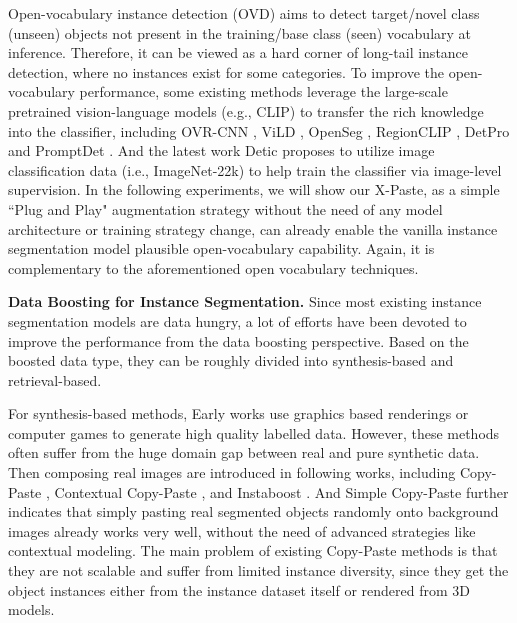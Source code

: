 \documentclass{article}
\begin{document}
Open-vocabulary instance detection (OVD) aims to detect target/novel class (unseen) objects not present in the training/base class (seen) vocabulary at inference. Therefore, it can be viewed as a hard corner of long-tail instance detection, where no instances exist for some categories. To improve the open-vocabulary performance, some existing methods leverage the large-scale pretrained vision-language models (e.g., CLIP) to transfer the rich knowledge into the classifier, including OVR-CNN \cite{ovr-cnn}, ViLD \cite{ViLD}, OpenSeg \cite{OpenSeg}, RegionCLIP \cite{RegionCLIP}, DetPro \cite{DetPro} and PromptDet \cite{PromptDet}. And the latest work Detic \cite{Detic} proposes to utilize image classification data (i.e., ImageNet-22k\cite{deng2009imagenet}) to help train the classifier via image-level supervision. In the following experiments, we will show our X-Paste, as a simple ``Plug and Play" augmentation strategy without the need of any model architecture or training strategy change, can already enable the vanilla instance segmentation model plausible open-vocabulary capability. Again, it is complementary to the aforementioned open vocabulary techniques. 


\noindent\textbf{Data Boosting for Instance Segmentation.}
Since most existing instance segmentation models are data hungry, a lot of efforts have been devoted to improve the performance from the data boosting perspective. Based on the boosted data type, they can be roughly divided into synthesis-based and retrieval-based.

For synthesis-based methods, Early works use graphics based renderings\cite{hinterstoisser2018pre,su2015render, hodavn2019photorealistic} or computer games\cite{richter2016playing,richter2017playing} to generate high quality labelled data. However, these methods often suffer from the huge domain gap between real and pure synthetic data.
Then composing real images are introduced in following works, including Copy-Paste \cite{Copy-Paste}, Contextual Copy-Paste \cite{Contextual-Copy-Paste}, and Instaboost \cite{Instaboost}. And Simple Copy-Paste \cite{Simple-Copy-Paste} further indicates that simply pasting real segmented objects randomly onto background images already works very well, without the need of advanced strategies like contextual modeling. The main problem of existing Copy-Paste methods is that they are not scalable and suffer from limited instance diversity, since they get the object instances either from the instance dataset itself or rendered from 3D models. 
\end{document}

